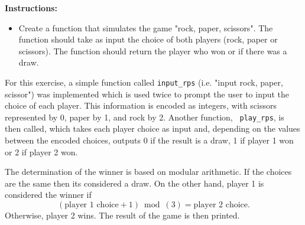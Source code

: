 \documentclass{article}
\newcounter{exercise}
\newenvironment{exr}[1]{%
    \refstepcounter{exercise}
    \begin{tcolorbox}[colback=blue!5!white, colframe=blue!75!black, title=Exercise \theexercise]
    \textbf{Instructions:} #1
    \end{tcolorbox}
    \vspace{1em}
}{}
\begin{document}


\begin{exr}{
    \begin{itemize}
        \item Create a function that simulates the game "rock, paper, scissors". The function should take as input the choice of both players (rock, paper or scissors). The function should return the player who won or if there was a draw.
    \end{itemize}
    }
\end{exr}

For this exercise, a simple function called \texttt{input\_rps} (i.e. "input rock, paper, scissor") was implemented which is used twice to prompt the user to input the choice of each player. This information is encoded as integers, with scissors represented by 0, paper by 1, and rock by 2. Another function, \texttt{ play\_rps}, is then called, which takes each player choice as input and, depending on the values between the encoded choices, outputs 0 if the result is a draw, 1 if player 1 won or 2 if player 2 won. 

The determination of the winner is based on modular arithmetic. If the choices are the same then its considered a draw. On the other hand, player 1 is considered the winner if
\begin{equation*}
    (\text{player 1 choice} + 1) \bmod(3) = \text{player 2 choice} .
\end{equation*}
Otherwise, player 2 wins. The result of the game is then printed.


\end{document}
